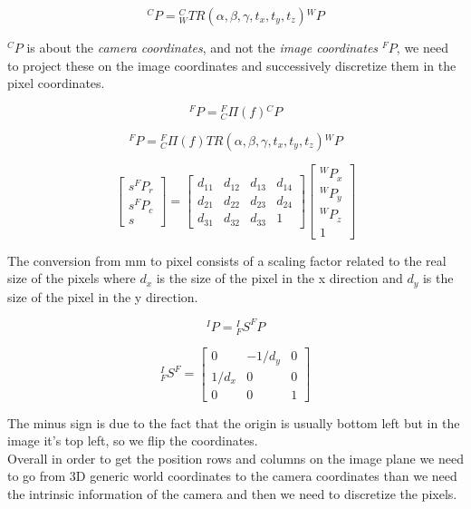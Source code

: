 \[
    {}^CP = {}^C_W TR(\alpha, \beta, \gamma, t_x, t_y, t_z) {}^WP
\]

\({}^CP\) is about the \textit{camera coordinates}, and
not the \textit{image coordinates} \({}^FP\), we need to project these on the image coordinates and successively discretize them in the pixel coordinates.

\[
    {}^FP = {}^F_C \varPi (f) {}^CP
\]

\[
    {}^FP = {}^F_C \varPi (f) TR(\alpha, \beta, \gamma, t_x, t_y, t_z) {}^WP
\]


\[
    \begin{bmatrix}
        s^FP_r \\
        s^FP_c \\
        s
    \end{bmatrix}
    =
    \begin{bmatrix}
        d_{11} & d_{12} & d_{13} & d_{14} \\
        d_{21} & d_{22} & d_{23} & d_{24} \\
        d_{31} & d_{32} & d_{33} & 1
    \end{bmatrix}
    \begin{bmatrix}
        {}^WP_x \\
        {}^WP_y \\
        {}^WP_z \\
        1
    \end{bmatrix}
\]

The conversion from mm to pixel consists of a scaling factor related to the real size of the pixels where \(d_x\) is the size of the pixel in the x direction and \(d_y\) is the size of the pixel in the y direction.

\[
  {}^IP={}^I_F S^F P  
\]


\[
    {}^I_F S^F
    = 
    \begin{bmatrix}
        0 & -1/d_y & 0\\
        1/d_x & 0 & 0\\
        0 & 0 & 1
    \end{bmatrix}
\]

The minus sign is due to the fact that the origin is usually bottom left but in the image it's top left, so we flip the coordinates.
\\
Overall in order to get the position rows and columns on the image plane we need to go from 3D generic world coordinates to the camera coordinates than we need the intrinsic information of the camera and then we need to discretize the pixels.

